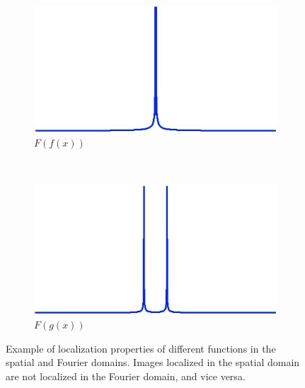 \documentclass{report}
\begin{document}
\begin{figure}[h]
        \begin{subfigure}[b]{0.2\textwidth}
                \includegraphics[width=\textwidth]{graphics/graph_fft_3.jpg}
                \caption{$F(f(x))$}
                \label{fig:mouse}
        \end{subfigure}
        ~
        \begin{subfigure}[b]{0.2\textwidth}
                \includegraphics[width=\textwidth]{graphics/graph_fft_4.jpg}
                \caption{$F(g(x))$}
                \label{fig:mouse}
        \end{subfigure}
        \caption{Example of localization properties of different functions in the spatial and Fourier domains. Images localized in the spatial domain are not localized in the Fourier domain, and vice versa.}\label{fig:fft_localization}
\end{figure}
\end{document}
